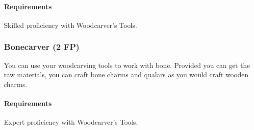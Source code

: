     \paragraph{Requirements} Skilled proficiency with Woodcarver's Tools.
\subsubsection{Bonecarver (2 FP)} \label{feat::bonecarver}
    You can use your woodcarving tools to work with bone.
    Provided you can get the raw materials, you can craft bone charms and qualars as you would craft wooden charms.
    \paragraph{Requirements} Expert proficiency with Woodcarver's Tools.

%
